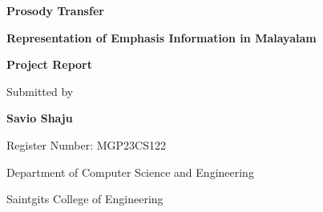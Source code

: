 \documentclass[12pt,a4paper]{report}
\theoremstyle{definition}
\begin{document}
\raggedbottom


\begin{titlepage}
\begin{center}

\vspace*{2.5cm}

{\Huge\bfseries Prosody Transfer}

\vspace{0.4cm}

{\Large\bfseries Representation of Emphasis Information in Malayalam}

\vspace{2cm}

{\Large\bfseries Project Report}

\vspace{1.5cm}

Submitted by

\vspace{0.4cm}

{\Large\bfseries Savio Shaju}

\vspace{0.2cm}

Register Number: MGP23CS122

\vfill

{\large Department of Computer Science and Engineering}

\vspace{0.2cm}

{\large Saintgits College of Engineering}

\vspace*{1cm}

\end{center}
\end{titlepage}



\tableofcontents

\newpage













\end{document}
